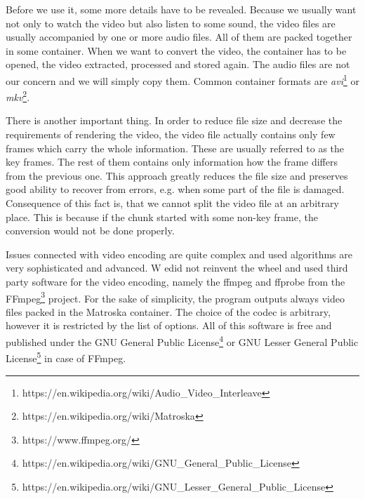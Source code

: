 Before we use it, some more details have to be revealed. Because we usually want not only to watch the video but also listen to some sound, the video files are usually accompanied by one or more audio files. All of them are packed together in some container. When we want to convert the video, the container has to be opened, the video extracted, processed and stored again. The audio files are not our concern and we will simply copy them. Common container formats are \textit{avi}\footnote{https://en.wikipedia.org/wiki/Audio\_Video\_Interleave} or \textit{mkv}\footnote{https://en.wikipedia.org/wiki/Matroska}.

There is another important thing. In order to reduce file size and decrease the requirements of rendering the video, the video file actually contains only few frames which carry the whole information. These are usually referred to as the key frames. The rest of them contains only information how the frame differs from the previous one. This approach greatly reduces the file size and preserves good ability to recover from errors, e.g. when some part of the file is damaged. Consequence of this fact is, that we cannot split the video file at an arbitrary place. This is because if the chunk started with some non-key frame, the conversion would not be done properly.

Issues connected with video encoding are quite complex and used algorithms are very sophisticated and advanced. W edid not reinvent the wheel and used third party software for the video encoding, namely the ffmpeg and ffprobe from the FFmpeg\footnote{https://www.ffmpeg.org/} project. For the sake of simplicity, the program outputs always video files packed in the Matroska container. The choice of the codec is arbitrary, however it is restricted by the list of options. All of this software is free and published under the GNU General Public License\footnote{https://en.wikipedia.org/wiki/GNU\_General\_Public\_License} or GNU Lesser General Public License\footnote{https://en.wikipedia.org/wiki/GNU\_Lesser\_General\_Public\_License} in case of FFmpeg.

